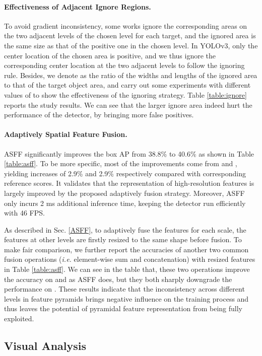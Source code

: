 \documentclass[10pt,twocolumn,letterpaper]{article}
\begin{document}
\paragraph{Effectiveness of Adjacent Ignore Regions.} To avoid gradient inconsistency, some works \cite{guide,FSAF} ignore the corresponding areas on the two adjacent levels of the chosen level for each target, and the ignored area is the same size as that of the positive one in the chosen level. In YOLOv3, only the center location of the chosen area is positive, and we thus ignore the corresponding center location at the two adjacent levels to follow the ignoring rule. Besides, we denote  as the ratio of the widths and lengths of the ignored area to that of the target object area, and carry out some experiments with different values of  to show the effectiveness of the ignoring strategy. Table \ref{table:ignore} reports the study results. We can see that the larger ignore area indeed hurt the performance of the detector, by bringing more false positives.    

\paragraph{Adaptively Spatial Feature Fusion.} ASFF significantly improves the box AP from 38.8\% to 40.6\% as shown in Table \ref{table:asff}. To be more specific, most of the improvements come from  and , yielding increases of 2.9\% and 2.9\% respectively compared with corresponding reference scores. It validates that the representation of high-resolution features is largely improved by the proposed adaptively fusion strategy. Moreover, ASFF only incurs 2 ms additional inference time, keeping the detector run efficiently with 46 FPS.

As described in Sec. \ref{ASFF}, to adaptively fuse the features for each scale, the features at other levels are firstly resized to the same shape before fusion. To make fair comparison, we further report the accuracies of another two common fusion operations (\emph{i.e.} element-wise sum and concatenation) with resized features in Table \ref{table:asff}. We can see in the table that, these two operations improve the accuracy on  and  as ASFF does, but they both sharply downgrade the performance on . These results indicate that the inconsistency across different levels in feature pyramids brings negative influence on the training process and thus leaves the potential of pyramidal feature representation from being fully exploited.

\subsection{Visual Analysis}
\end{document}
